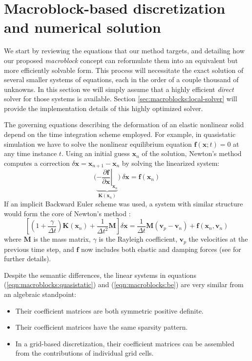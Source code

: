 \section{Macroblock-based discretization and numerical solution}
\label{sec:macroblocks:discretization}

We start by reviewing the equations that our method targets, and
detailing how our proposed \emph{macroblock} concept can reformulate
them into an equivalent but more efficiently solvable form. This
process will necessitate the exact solution of several smaller systems
of equations, each in the order of a couple thousand of unknowns. In
this section we will simply assume that a highly efficient
\emph{direct} solver for those systems is available. Section
\ref{sec:macroblocks:local-solver} will provide the implementation details of this
highly optimized solver.

The governing equations describing the deformation of an elastic
nonlinear solid depend on the time integration scheme employed. For
example, in quasistatic simulation we have to solve the nonlinear
equilibrium equation $\mathbf{f}(\mathbf{x};t)=0$ at any time instance
$t$. Using an initial guess $\mathbf{x}_n$ of the solution,
Newton's method computes a correction
$\delta\mathbf{x}=\mathbf{x}_{n+1}\!\!-\!\mathbf{x}_n$ by
solving the linearized system:
\begin{equation}
  \bigg(
\underbrace{\left.
-\frac{\partial\mathbf{f}}{\partial\mathbf{x}}
\right|_{\mathbf{x}_n}
}_{\mathbf{K}(\mathbf{x}_n)}
\bigg) \ 
\delta\mathbf{x}=\mathbf{f}(\mathbf{x}_n)
\label{eqn:macroblocks:quasistatic}
\end{equation}
If an implicit Backward Euler scheme was used, a system with similar
structure would form the core of Newton's method \citep{SifakB:2012}:
\begin{equation}
\left[(1\!\!+\!\!\frac{\gamma}{\Delta t})\mathbf{K}(\mathbf{x}_n)\!+\!\frac{1}{\Delta t^2}\mathbf{M}\right]
\delta\mathbf{x}=\frac{1}{\Delta t}\mathbf{M}(\mathbf{v}_p\!\!-\!\mathbf{v}_n)+\mathbf{f}(\mathbf{x}_n,\mathbf{v}_n)
\label{eqn:macroblocks:be}
\end{equation}
where $\mathbf{M}$ is the mass matrix, $\gamma$ is the Rayleigh
coefficient, $\mathbf{v}_p$ the velocities at the previous time step,
and $\mathbf{f}$ now includes both elastic and damping forces (see
\citep{SifakB:2012} for further details).

Despite the semantic differences, the linear systems in equations
(\ref{eqn:macroblocks:quasistatic}) and (\ref{eqn:macroblocks:be}) are very similar from an
algebraic standpoint:
\begin{itemize}
\item{Their coefficient matrices are both symmetric positive definite.}
\item{Their coefficient matrices have the same sparsity pattern.}
\item{In a grid-based discretization, their coefficient matrices can
    be assembled from the contributions of individual grid cells.}
\end{itemize}

